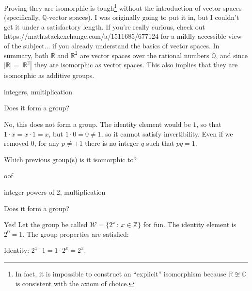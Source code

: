 \documentclass[../gatm_answers.tex]{subfiles}
\begin{document}
Proving they are isomorphic is tough\footnote{In fact, it is impossible to construct an ``explicit'' isomorphism because $\mathbb{R} \not \cong \mathbb{C}$ is consistent with the axiom of choice.} without the introduction of vector spaces (specifically, $\mathbb{Q}$-vector spaces). I was originally going to put it in, but I couldn't get it under a satisfactory length. If you're really curious, check out https://math.stackexchange.com/a/1511685/677124 for a mildly accessible view of the subject... if you already understand the basics of vector spaces. In summary, both $\mathbb{R}$ and $\mathbb{R}^2$ are vector spaces over the rational numbers $\mathbb{Q}$, and since $|\mathbb{R}|=|\mathbb{R}^2|$ they are isomorphic as vector spaces. This also implies that they are isomorphic as additive groups.

\begin{inner_problem}
\item integers, multiplication
\end{inner_problem}

\begin{iinner_problem}[start=1]
\item Does it form a group?
\end{iinner_problem}

No, this does not form a group. The identity element would be $1$, so that $1\cdot x = x\cdot 1 = x$, but $1\cdot 0 = 0\neq 1$, so it cannot satisfy invertibility. Even if we removed $0$, for any $p\neq \pm 1$ there is no integer $q$ such that $pq=1$.

\begin{iinner_problem}
\item Which previous group(s) is it isomorphic to?
\end{iinner_problem}

oof

\begin{inner_problem}
\item integer powers of $2$, multiplication
\end{inner_problem}

\begin{iinner_problem}[start=1]
\item Does it form a group?
\end{iinner_problem}

Yes! Let the group be called $\mathcal{W}=\{2^x\, :\, x\in \mathbb{Z}\}$ for fun. The identity element is $2^0=1$. The group properties are satisfied:

Identity: $2^x\cdot 1=1\cdot 2^x=2^x$.
\end{document}
